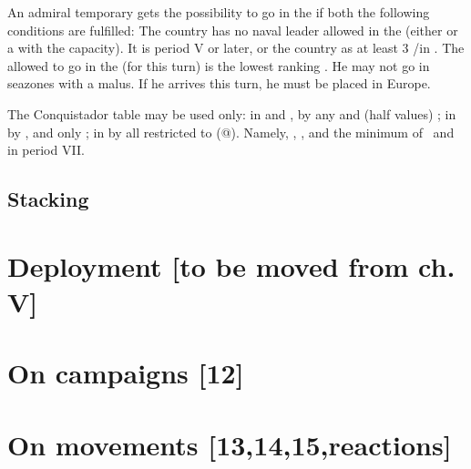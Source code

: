 An admiral temporary gets the possibility to go in the \ROTW if both the
following conditions are fulfilled:
\bparag The country has no naval leader allowed in the \ROTW (either \LeaderE
or a \LeaderA with the \ROTW capacity).
\bparag It is period V or later, or the country as at least 3 \COL/\TP in
.
\bparag The \LeaderA allowed to go in the \ROTW (for this turn) is the lowest
ranking \LeaderA. He may not go in seazones with a malus. If he arrives this
turn, he must be placed in Europe.


The Conquistador table may be used only:
\bparag in  and , by any \LeaderC and
\LeaderE (half values) ;
\bparag in  by ,  and
 only ;
\bparag in  by all \LeaderC restricted to 
(@). Namely, , ,  and the minimum
\LeaderC@ of \FRA and \ANG in period VII.

\subsection{Stacking}\label{chMilitary:Stacking}


\section{Deployment [to be moved from ch. V]}


\section{On campaigns [12]}

\section{On movements [13,14,15,reactions]}
